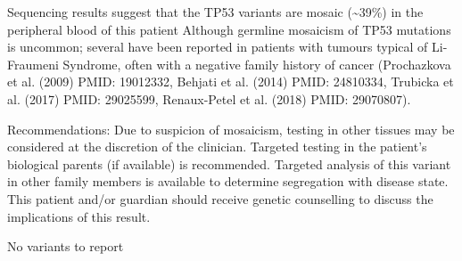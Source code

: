 \documentclass[8pt,letterpaper]{extarticle}
\begin{document}
Sequencing results suggest that the TP53 variants are mosaic (\textasciitilde 39\%) in the peripheral blood of this patient  Although germline mosaicism of TP53 mutations is uncommon; several have been reported in patients with tumours typical of Li-Fraumeni Syndrome, often with a negative family history of cancer (Prochazkova et al. (2009) PMID: 19012332, Behjati et al. (2014) PMID: 24810334, Trubicka et al. (2017) PMID: 29025599, Renaux-Petel et al. (2018) PMID: 29070807).

Recommendations: Due to suspicion of mosaicism, testing in other tissues may be considered at the discretion of the clinician. Targeted testing in the patient's biological parents (if available) is recommended. Targeted analysis of this variant in other family members is available to determine segregation with disease state. This patient and/or guardian should receive genetic counselling to discuss the implications of this result.

\vspace{1em}

No variants to report 
\end{document}
